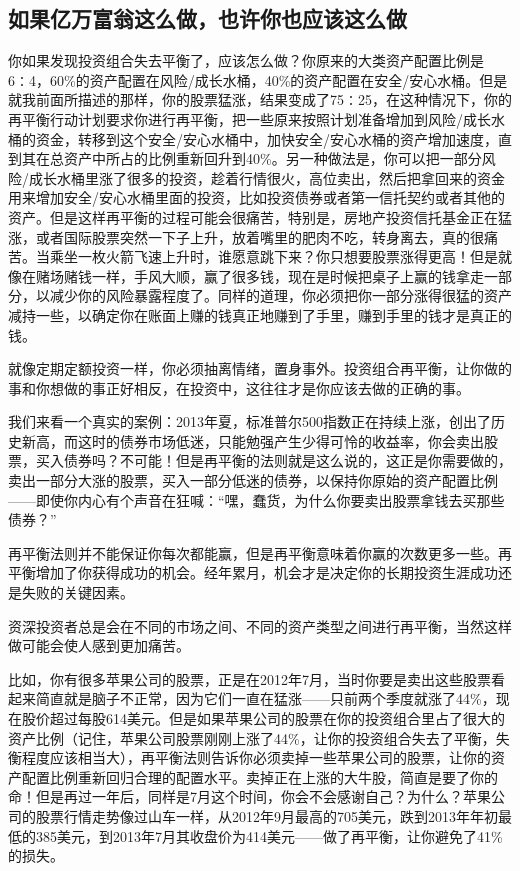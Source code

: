 \subsection{如果亿万富翁这么做，也许你也应该这么做}

你如果发现投资组合失去平衡了，应该怎么做？你原来的大类资产配置比例是6∶4，60\%的资产配置在风险/成长水桶，40\%的资产配置在安全/安心水桶。但是就我前面所描述的那样，你的股票猛涨，结果变成了75∶25，在这种情况下，你的再平衡行动计划要求你进行再平衡，把一些原来按照计划准备增加到风险/成长水桶的资金，转移到这个安全/安心水桶中，加快安全/安心水桶的资产增加速度，直到其在总资产中所占的比例重新回升到40\%。另一种做法是，你可以把一部分风险/成长水桶里涨了很多的投资，趁着行情很火，高位卖出，然后把拿回来的资金用来增加安全/安心水桶里面的投资，比如投资债券或者第一信托契约或者其他的资产。但是这样再平衡的过程可能会很痛苦，特别是，房地产投资信托基金正在猛涨，或者国际股票突然一下子上升，放着嘴里的肥肉不吃，转身离去，真的很痛苦。当乘坐一枚火箭飞速上升时，谁愿意跳下来？你只想要股票涨得更高！但是就像在赌场赌钱一样，手风大顺，赢了很多钱，现在是时候把桌子上赢的钱拿走一部分，以减少你的风险暴露程度了。同样的道理，你必须把你一部分涨得很猛的资产减持一些，以确定你在账面上赚的钱真正地赚到了手里，赚到手里的钱才是真正的钱。

就像定期定额投资一样，你必须抽离情绪，置身事外。投资组合再平衡，让你做的事和你想做的事正好相反，在投资中，这往往才是你应该去做的正确的事。

我们来看一个真实的案例：2013年夏，标准普尔500指数正在持续上涨，创出了历史新高，而这时的债券市场低迷，只能勉强产生少得可怜的收益率，你会卖出股票，买入债券吗？不可能！但是再平衡的法则就是这么说的，这正是你需要做的，卖出一部分大涨的股票，买入一部分低迷的债券，以保持你原始的资产配置比例——即使你内心有个声音在狂喊：“嘿，蠢货，为什么你要卖出股票拿钱去买那些债券？”

再平衡法则并不能保证你每次都能赢，但是再平衡意味着你赢的次数更多一些。再平衡增加了你获得成功的机会。经年累月，机会才是决定你的长期投资生涯成功还是失败的关键因素。

资深投资者总是会在不同的市场之间、不同的资产类型之间进行再平衡，当然这样做可能会使人感到更加痛苦。

比如，你有很多苹果公司的股票，正是在2012年7月，当时你要是卖出这些股票看起来简直就是脑子不正常，因为它们一直在猛涨——只前两个季度就涨了44\%，现在股价超过每股614美元。但是如果苹果公司的股票在你的投资组合里占了很大的资产比例（记住，苹果公司股票刚刚上涨了44\%，让你的投资组合失去了平衡，失衡程度应该相当大），再平衡法则告诉你必须卖掉一些苹果公司的股票，让你的资产配置比例重新回归合理的配置水平。卖掉正在上涨的大牛股，简直是要了你的命！但是再过一年后，同样是7月这个时间，你会不会感谢自己？为什么？苹果公司的股票行情走势像过山车一样，从2012年9月最高的705美元，跌到2013年年初最低的385美元，到2013年7月其收盘价为414美元——做了再平衡，让你避免了41\%的损失。

